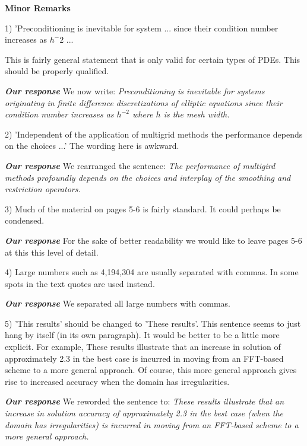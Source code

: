 \documentclass[10pt]{report}
\begin{document}
{\bf Minor Remarks}


1) 'Preconditioning is inevitable for system ... since their condition number
increases as $h^-2$ ...

This is fairly general statement that is only valid for certain types of PDEs.
This should be properly qualified.

{\it {\bf Our response}} We now write: {\it  Preconditioning is inevitable for
systems originating in finite difference discretizations of elliptic equations
since their condition number increases as $h^{-2}$ where $h$ is the mesh width.}




2) 'Independent of the application of multigrid methods the performance depends
on the choices ...' The wording here is awkward.

{\it {\bf Our response}} We rearranged the sentence: {\it The performance of
multigird methods profoundly depends on the choices and interplay of the
smoothing and restriction operators.}


3) Much of the material on pages 5-6 is fairly standard. It could perhaps be
condensed.

{\it {\bf Our response}} For the sake of better readability we would like to
leave pages 5-6 at this this level of detail.

4) Large numbers such as 4,194,304 are usually separated with commas. In some
spots in the text quotes are used instead.

{\it {\bf Our response}}  We separated all large numbers with commas.

5) 'This results' should be changed to 'These results'. This sentence seems to
just hang by itself (in its own paragraph). It would be better to be a little
more explicit. For example, These results illustrate that an increase in
solution of approximately 2.3 in the best case is incurred in moving from an
FFT-based scheme to a more general approach. Of course, this more general
approach gives rise to increased accuracy when the domain has irregularities.

{\it {\bf Our response}}  We reworded the sentence to: {\it These results
illustrate that an increase in solution accuracy of approximately 2.3 in the
best case (when the domain has irregularities) is incurred in moving from an
FFT-based scheme to a more general approach. }
\end{document}
